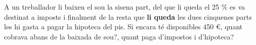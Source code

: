 \begin{autoaval}{51}
\begin{mylist}
	\exer[2]  A un treballador li baixen el sou la sisena part, del que li queda el 25 \% es va destinat a imposts i finalment de la resta que \textbf{li queda} les dues cinquenes parts les hi gasta a pagar la hipoteca del pis. Si encara té disponibles 450 \euro{}, quant cobrava abans de la baixada de sou?, quant paga d'impostos i d'hipoteca?
	
\end{mylist}


\end{autoaval}












\newpage

